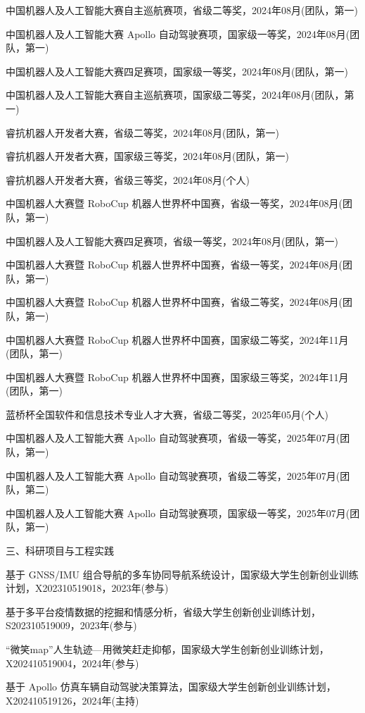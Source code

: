{\begin{enumerate}[label={[\arabic*]},wide=2em,itemsep=1pt,topsep=2pt]
  \item 中国机器人及人工智能大赛自主巡航赛项，省级二等奖，2024年08月(团队，第一)
  \item 中国机器人及人工智能大赛 Apollo 自动驾驶赛项，国家级一等奖，2024年08月(团队，第一)
  \item 中国机器人及人工智能大赛四足赛项，国家级一等奖，2024年08月(团队，第一)
  \item 中国机器人及人工智能大赛自主巡航赛项，国家级二等奖，2024年08月(团队，第一)
  \item 睿抗机器人开发者大赛，省级二等奖，2024年08月(团队，第一)
  \item 睿抗机器人开发者大赛，国家级三等奖，2024年08月(团队，第一)
  \item 睿抗机器人开发者大赛，省级三等奖，2024年08月(个人)
  \item 中国机器人大赛暨 RoboCup 机器人世界杯中国赛，省级一等奖，2024年08月(团队，第一)
  \item 中国机器人及人工智能大赛四足赛项，省级一等奖，2024年08月(团队，第一)
  \item 中国机器人大赛暨 RoboCup 机器人世界杯中国赛，省级一等奖，2024年08月(团队，第一)
  \item 中国机器人大赛暨 RoboCup 机器人世界杯中国赛，省级二等奖，2024年08月(团队，第一)
  \item 中国机器人大赛暨 RoboCup 机器人世界杯中国赛，国家级二等奖，2024年11月(团队，第一)
  \item 中国机器人大赛暨 RoboCup 机器人世界杯中国赛，国家级三等奖，2024年11月(团队，第一)
  \item 蓝桥杯全国软件和信息技术专业人才大赛，省级二等奖，2025年05月(个人)
  \item 中国机器人及人工智能大赛 Apollo 自动驾驶赛项，省级一等奖，2025年07月(团队，第一)
  \item 中国机器人及人工智能大赛 Apollo 自动驾驶赛项，省级二等奖，2025年07月(团队，第二)
  \item 中国机器人及人工智能大赛 Apollo 自动驾驶赛项，国家级一等奖，2025年07月(团队，第一)
\end{enumerate}

\noindent 三、科研项目与工程实践

\begin{enumerate}[label={[\arabic*]},wide=2em,itemsep=2pt,topsep=2pt]
  \item 基于 GNSS/IMU 组合导航的多车协同导航系统设计，国家级大学生创新创业训练计划，X202310519018，2023年(参与)
  \item 基于多平台疫情数据的挖掘和情感分析，省级大学生创新创业训练计划，S202310519009，2023年(参与)
  \item “微笑map”人生轨迹—用微笑赶走抑郁，国家级大学生创新创业训练计划，X202410519004，2024年(参与)
  \item 基于 Apollo 仿真车辆自动驾驶决策算法，国家级大学生创新创业训练计划，X202410519126，2024年(主持)
\end{enumerate}

}

